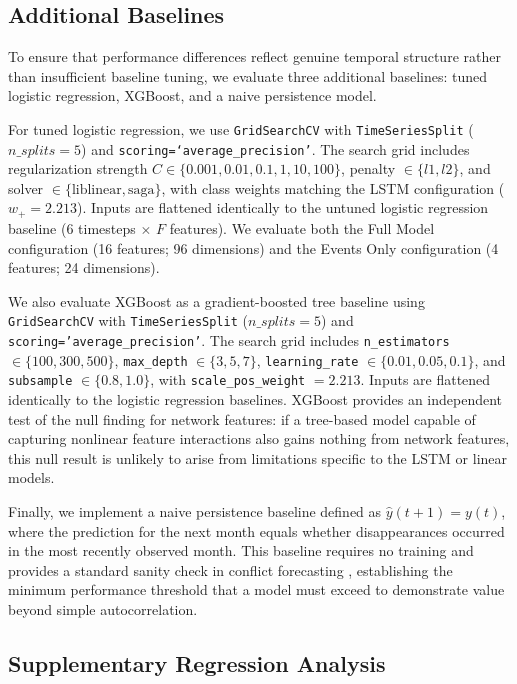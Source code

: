 \documentclass[pdflatex,sn-mathphys-num]{sn-jnl}%
\theoremstyle{thmstyleone}%
\theoremstyle{thmstyletwo}%
\theoremstyle{thmstylethree}%
\begin{document}
\subsection{Additional Baselines}\label{sec:additional_baselines}

To ensure that performance differences reflect genuine temporal structure rather than insufficient baseline tuning, we evaluate three additional baselines: tuned logistic regression, XGBoost, and a naive persistence model.

For tuned logistic regression, we use \texttt{GridSearchCV} with \texttt{TimeSeriesSplit} ($n\_splits=5$) and \texttt{scoring=`average\_precision'}. The search grid includes regularization strength $C \in \{0.001, 0.01, 0.1, 1, 10, 100\}$, penalty $\in \{l1, l2\}$, and solver $\in \{\text{liblinear}, \text{saga}\}$, with class weights matching the LSTM configuration ($w_+ = 2.213$). Inputs are flattened identically to the untuned logistic regression baseline (6 timesteps $\times$ $F$ features). We evaluate both the Full Model configuration (16 features; 96 dimensions) and the Events Only configuration (4 features; 24 dimensions).

We also evaluate XGBoost as a gradient-boosted tree baseline using \texttt{GridSearchCV} with \texttt{TimeSeriesSplit} ($n\_splits=5$) and \texttt{scoring='average\_precision'}. The search grid includes \texttt{n\_estimators} $\in \{100, 300, 500\}$, \texttt{max\_depth} $\in \{3, 5, 7\}$, \texttt{learning\_rate} $\in \{0.01, 0.05, 0.1\}$, and \texttt{subsample} $\in \{0.8, 1.0\}$, with \texttt{scale\_pos\_weight} $= 2.213$. Inputs are flattened identically to the logistic regression baselines. XGBoost provides an independent test of the null finding for network features: if a tree-based model capable of capturing nonlinear feature interactions also gains nothing from network features, this null result is unlikely to arise from limitations specific to the LSTM or linear models.

Finally, we implement a naive persistence baseline defined as $\hat{y}(t{+}1) = y(t)$, where the prediction for the next month equals whether disappearances occurred in the most recently observed month. This baseline requires no training and provides a standard sanity check in conflict forecasting \cite{hegre2024views}, establishing the minimum performance threshold that a model must exceed to demonstrate value beyond simple autocorrelation.

\subsection{Supplementary Regression Analysis}\label{sec:poisson_methods}
\end{document}
